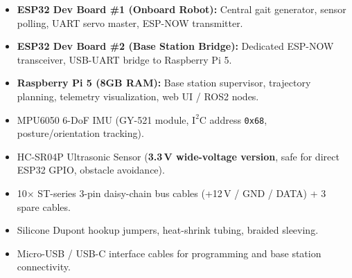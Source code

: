 \documentclass[11pt,a4paper]{article}
\begin{document}
\begin{description}[leftmargin=1.8em, itemsep=0.4em]
    \item[\textbf{Microcontrollers \& Compute:}]
    \begin{itemize}[leftmargin=1.2em, itemsep=0.15em]
        \item \textbf{ESP32 Dev Board \#1 (Onboard Robot):} Central gait generator, sensor polling, UART servo master, ESP-NOW transmitter.
        \item \textbf{ESP32 Dev Board \#2 (Base Station Bridge):} Dedicated ESP-NOW transceiver, USB-UART bridge to Raspberry Pi 5.
        \item \textbf{Raspberry Pi 5 (8GB RAM):} Base station supervisor, trajectory planning, telemetry visualization, web UI / ROS2 nodes.
    \end{itemize}

    \item[\textbf{Sensors:}]
    \begin{itemize}[leftmargin=1.2em, itemsep=0.15em]
        \item MPU6050 6-DoF IMU (GY-521 module, $\text{I}^2\text{C}$ address \texttt{0x68}, posture/orientation tracking).
        \item HC-SR04P Ultrasonic Sensor (\textbf{3.3\,V wide-voltage version}, safe for direct ESP32 GPIO, obstacle avoidance).
    \end{itemize}

    \item[\textbf{Cables \& Fasteners:}]
    \begin{itemize}[leftmargin=1.2em, itemsep=0.15em]
        \item 10$\times$ ST-series 3-pin daisy-chain bus cables (+12\,V / GND / DATA) + 3 spare cables.
        \item Silicone Dupont hookup jumpers, heat-shrink tubing, braided sleeving.
        \item Micro-USB / USB-C interface cables for programming and base station connectivity.
    \end{itemize}
\end{description}
\end{document}
